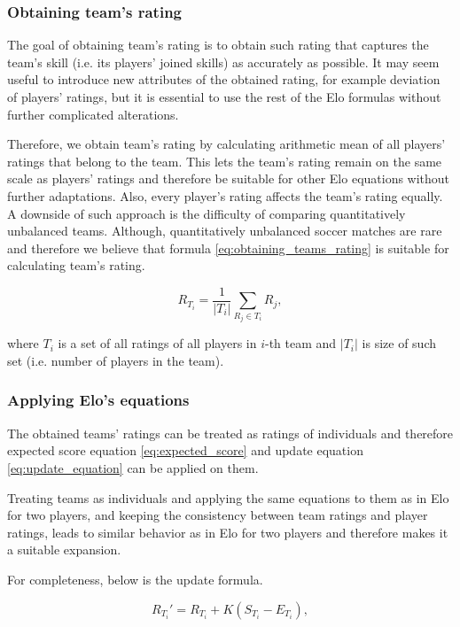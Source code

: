 \subsubsection{Obtaining team's rating}
The goal of obtaining team's rating is to obtain such rating that captures the team's skill (i.e. its players' joined skills) as accurately as possible. It may seem useful to introduce new attributes of the obtained rating, for example deviation of players' ratings, but it is essential to use the rest of the Elo formulas without further complicated alterations.

Therefore, we obtain team's rating by calculating arithmetic mean of all players' ratings that belong to the team. This lets the team's rating remain on the same scale as players' ratings and therefore be suitable for other Elo equations without further adaptations. Also, every player's rating affects the team's rating equally. A downside of such approach is the difficulty of comparing quantitatively unbalanced teams. Although, quantitatively unbalanced soccer matches are rare and therefore we believe that formula \eqref{eq:obtaining_teams_rating} is suitable for calculating team's rating.

\begin{equation}
\label{eq:obtaining_teams_rating}
R_{T_i} = \frac{1}{|T_i|}\sum_{R_j \in T_i}{R_j},
\end{equation}

\noindent where $T_i$ is a set of all ratings of all players in $i$-th team and $|T_i|$ is size of such set (i.e. number of players in the team).

\subsubsection{Applying Elo's equations}
The obtained teams' ratings can be treated as ratings of individuals and therefore expected score equation \eqref{eq:expected_score} and update equation \eqref{eq:update_equation} can be applied on them.

Treating teams as individuals and applying the same equations to them as in Elo for two players, and keeping the consistency between team ratings and player ratings, leads to similar behavior as in Elo for two players and therefore makes it a suitable expansion.

For completeness, below is the update formula.

\begin{equation}
\label{eq:teams_update}
R_{T_i}' = R_{T_i} + K(S_{T_i} - E_{T_i}),
\end{equation}

